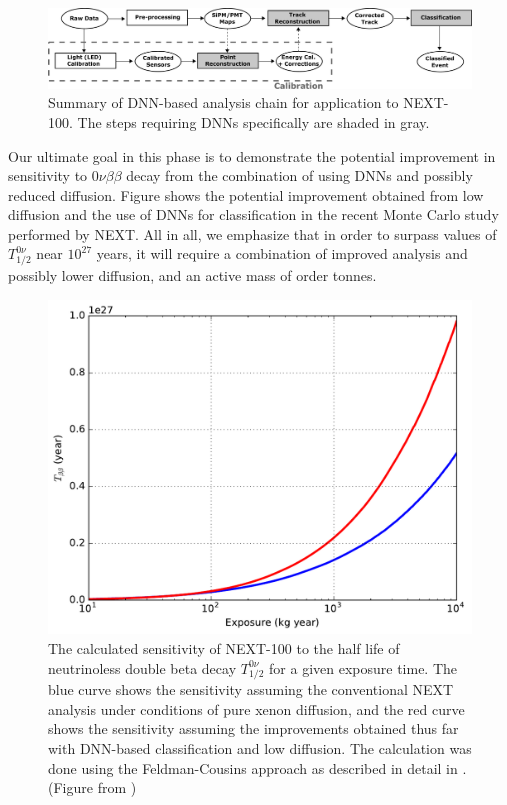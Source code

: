 \documentclass[11pt,a4paper]{article}
\begin{document}
\begin{figure}[!htb]
	\centering
	\includegraphics[scale=0.18]{fig/analysis_diagram.pdf}
	\caption{\label{fig.analysis}Summary of DNN-based analysis chain for application to NEXT-100. The steps requiring DNNs specifically are shaded in gray.}
\end{figure}

Our ultimate goal in this phase is to demonstrate the potential improvement in sensitivity to $0\nu\beta\beta$ decay from the combination of using DNNs and possibly reduced diffusion. Figure shows the potential improvement obtained from low diffusion and the use of DNNs for classification in the recent Monte Carlo study \cite{NEXT_DNN} performed by NEXT. All in all, we emphasize that in order to surpass values of $T^{0\nu}_{1/2}$ near $10^{27}$ years, it will require a combination of improved analysis and possibly lower diffusion, and an active mass of order tonnes.\\

\begin{figure}[!htb]
	\centering
	\includegraphics[scale=0.6]{fig/half_life_sensitivity.pdf}
	\caption{\label{fig.halflife}The calculated sensitivity of NEXT-100 to the half life of neutrinoless double beta decay $T^{0\nu}_{1/2}$ for a given exposure time. The blue curve shows the sensitivity assuming the conventional NEXT analysis under conditions of pure xenon diffusion, and the red curve shows the sensitivity assuming the improvements obtained thus far with DNN-based classification and low diffusion. The calculation was done using the Feldman-Cousins approach \cite{Feldman_1998} as described in detail in \cite{NEXT_sensitivity}. (Figure from \cite{NEXT_DNN})}
\end{figure}
\end{document}
